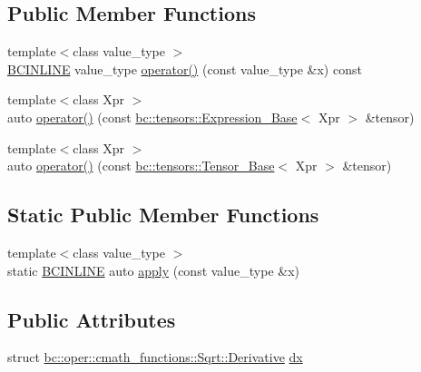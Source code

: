 \subsection*{Public Member Functions}
\begin{DoxyCompactItemize}
\item 
{\footnotesize template$<$class value\+\_\+type $>$ }\\\hyperlink{common_8h_a6699e8b0449da5c0fafb878e59c1d4b1}{B\+C\+I\+N\+L\+I\+NE} value\+\_\+type \hyperlink{structbc_1_1oper_1_1cmath__functions_1_1Sqrt_aef95681ef3d58402b24cf030ae32f69e}{operator()} (const value\+\_\+type \&x) const
\item 
{\footnotesize template$<$class Xpr $>$ }\\auto \hyperlink{structbc_1_1oper_1_1cmath__functions_1_1Sqrt_a6fd1a70d49b0085e9c557ef9957d206c}{operator()} (const \hyperlink{classbc_1_1tensors_1_1Expression__Base}{bc\+::tensors\+::\+Expression\+\_\+\+Base}$<$ Xpr $>$ \&tensor)
\item 
{\footnotesize template$<$class Xpr $>$ }\\auto \hyperlink{structbc_1_1oper_1_1cmath__functions_1_1Sqrt_ae3db377af08dcb7088e5df330a20a019}{operator()} (const \hyperlink{classbc_1_1tensors_1_1Tensor__Base}{bc\+::tensors\+::\+Tensor\+\_\+\+Base}$<$ Xpr $>$ \&tensor)
\end{DoxyCompactItemize}
\subsection*{Static Public Member Functions}
\begin{DoxyCompactItemize}
\item 
{\footnotesize template$<$class value\+\_\+type $>$ }\\static \hyperlink{common_8h_a6699e8b0449da5c0fafb878e59c1d4b1}{B\+C\+I\+N\+L\+I\+NE} auto \hyperlink{structbc_1_1oper_1_1cmath__functions_1_1Sqrt_a52f2def1fd0b2e0318cd78ebdc753fcf}{apply} (const value\+\_\+type \&x)
\end{DoxyCompactItemize}
\subsection*{Public Attributes}
\begin{DoxyCompactItemize}
\item 
struct \hyperlink{structbc_1_1oper_1_1cmath__functions_1_1Sqrt_1_1Derivative}{bc\+::oper\+::cmath\+\_\+functions\+::\+Sqrt\+::\+Derivative} \hyperlink{structbc_1_1oper_1_1cmath__functions_1_1Sqrt_a3bd63de2e9549ccacf912e1008ed83f0}{dx}
\end{DoxyCompactItemize}


